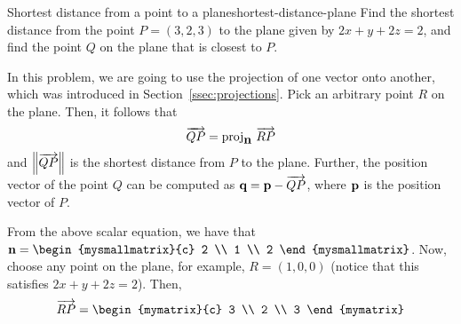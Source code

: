 \begin{example}{Shortest distance from a point to a plane}{shortest-distance-plane}
  Find the shortest distance from the point $P = (3,2,3)$ to the plane
  given by $2x + y + 2z = 2$, and find the point $Q$ on the plane
  that is closest to $P$.%
\end{example}

\begin{solution}
  In this problem, we are going to use the projection of one vector
  onto another, which was introduced in
  Section~\ref{ssec:projections}.  Pick an arbitrary point $R$ on
  the plane. Then, it follows that
  \begin{equation*}
    \longvect{QP} = \proj_{\vect{n}}\,\longvect{RP}
  \end{equation*}
  and $\left\|\overrightarrow{QP}\right\|$ is the shortest distance from $P$ to the
  plane. Further, the position vector of the point $Q$ can be computed
  as $\mbox{\bf q} = \mbox{\bf p} - \overrightarrow{QP}$, where $\mbox{\bf p}$ is the
  position vector of $P$.
  \begin{center}
  \end{center}
  From the above scalar equation, we have that $\vect{n} =
  \begin{mysmallmatrix}{c} 2 \\ 1 \\ 2 \end{mysmallmatrix}$.  Now, choose any
  point on the plane, for example, $R = (1,0,0)$ (notice that this
  satisfies $2x+y+2z=2$).  Then,
  \begin{equation*}
    \longvect{RP} = \begin{mymatrix}{c} 3 \\ 2 \\ 3 \end{mymatrix}

\end{equation*}
\end{solution}
